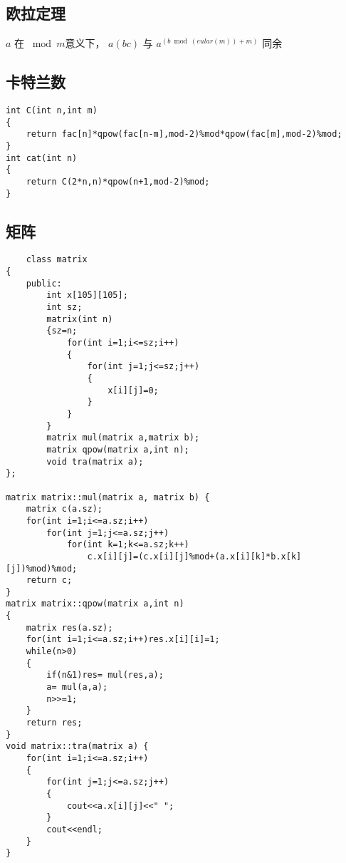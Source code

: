 \documentclass[]{article}
\begin{document}
\hypertarget{ux6b27ux62c9ux5b9aux7406}{%
\subsection{欧拉定理}\label{ux6b27ux62c9ux5b9aux7406}}

\(a\) 在 \(\bmod m\)意义下， \(a(bc)\) 与 \(a ^ (b \bmod(eular(m))+m)\)
同余

\hypertarget{ux5361ux7279ux5170ux6570}{%
\subsection{卡特兰数}\label{ux5361ux7279ux5170ux6570}}

\begin{verbatim}
int C(int n,int m)
{
    return fac[n]*qpow(fac[n-m],mod-2)%mod*qpow(fac[m],mod-2)%mod;
}
int cat(int n)
{
    return C(2*n,n)*qpow(n+1,mod-2)%mod;
}
\end{verbatim}

\hypertarget{ux77e9ux9635}{%
\subsection{矩阵}\label{ux77e9ux9635}}

\begin{verbatim}
    class matrix
{
    public:
        int x[105][105];
        int sz;
        matrix(int n)
        {sz=n;
            for(int i=1;i<=sz;i++)
            {
                for(int j=1;j<=sz;j++)
                {
                    x[i][j]=0;
                }
            }
        }
        matrix mul(matrix a,matrix b);
        matrix qpow(matrix a,int n);
        void tra(matrix a);
};

matrix matrix::mul(matrix a, matrix b) {
    matrix c(a.sz);
    for(int i=1;i<=a.sz;i++)
        for(int j=1;j<=a.sz;j++)
            for(int k=1;k<=a.sz;k++)
                c.x[i][j]=(c.x[i][j]%mod+(a.x[i][k]*b.x[k][j])%mod)%mod;
    return c;
}
matrix matrix::qpow(matrix a,int n)
{
    matrix res(a.sz);
    for(int i=1;i<=a.sz;i++)res.x[i][i]=1;
    while(n>0)
    {
        if(n&1)res= mul(res,a);
        a= mul(a,a);
        n>>=1;
    }
    return res;
}
void matrix::tra(matrix a) {
    for(int i=1;i<=a.sz;i++)
    {
        for(int j=1;j<=a.sz;j++)
        {
            cout<<a.x[i][j]<<" ";
        }
        cout<<endl;
    }
}
\end{verbatim}
\end{document}
